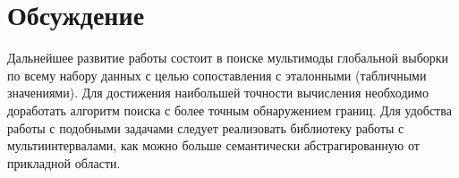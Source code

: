\documentclass[12pt,a4paper]{article}
\begin{document}
        \section{Обсуждение}
        Дальнейшее развитие работы состоит в поиске мультимоды глобальной выборки по всему набору данных с целью сопоставления с эталонными (табличными значениями). Для достижения наибольшей точности вычисления необходимо доработать алгоритм поиска с более точным обнаружением границ. Для удобства работы с подобными задачами следует реализовать библиотеку работы с мультиинтервалами, как можно больше семантически абстрагированную от прикладной области.
        
\end{document}

